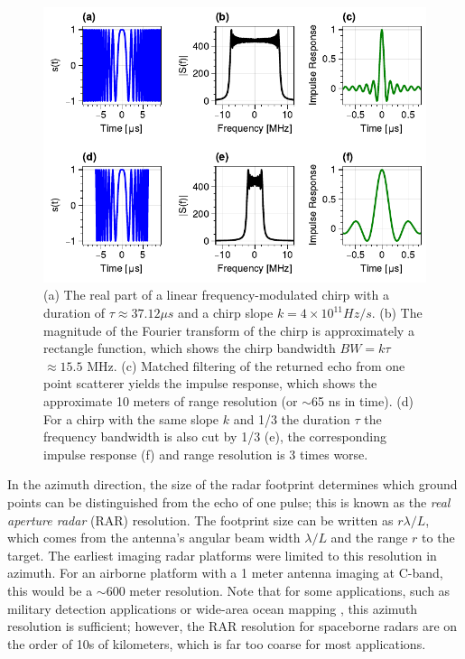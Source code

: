 \begin{figure}
	\centering
	\includegraphics[width=0.99\linewidth]{figures/chapter2-sar/radar-chirp-bandwidth-ers.pdf}
	\caption[Range resolution from chirp compression]{
		(a) The real part of a linear frequency-modulated chirp with a duration of $\tau \approx 37.12 \mu s$ and a chirp slope $k = 4 \times 10^{11} Hz / s$.
		(b) The magnitude of the Fourier transform of the chirp is approximately a rectangle function, which shows the chirp bandwidth $BW = k \tau$ $\approx 15.5$ MHz.
		(c) Matched filtering of the returned echo from one point scatterer yields the impulse response, which shows the approximate 10 meters of range resolution (or $\sim$65 ns in time).
		(d) For a chirp with the same slope $k$ and 1/3 the duration $\tau$ the frequency bandwidth is also cut by 1/3 (e), the corresponding impulse response (f) and range resolution is 3 times worse.
	}
	\label{fig:ch2-range-compress}
\end{figure}


In the azimuth direction, the size of the radar footprint determines which ground points can be distinguished from the echo of one pulse;  this is known as the \emph{real aperture radar} (RAR) resolution. The footprint size can be written as $r \lambda / L$, which comes from the antenna's angular beam width $\lambda / L$ and the range $r$ to the target. The earliest imaging radar platforms were limited to this resolution in azimuth. For an airborne platform with a 1 meter antenna imaging at C-band, this would be a $\sim$600 meter resolution. Note that for some applications, such as military detection applications or wide-area ocean mapping \cite{Simons2007InterferometricSyntheticAperture}, this azimuth resolution is sufficient; however, the RAR resolution for spaceborne radars are on the order of 10s of kilometers, which is far too coarse for most applications.


